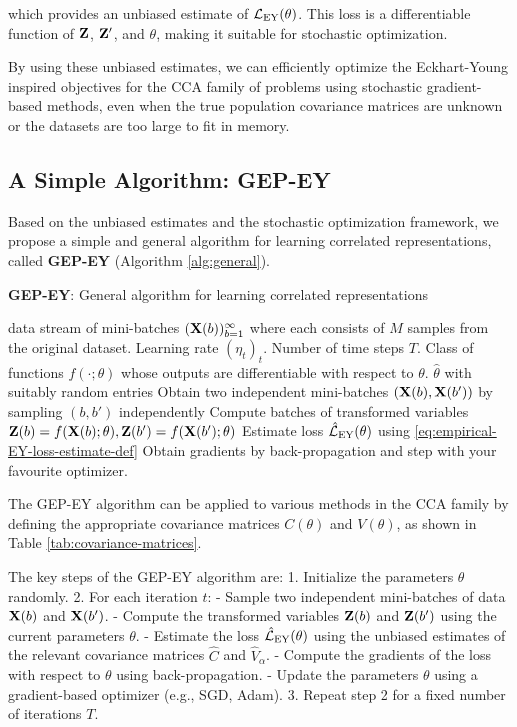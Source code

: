 which provides an unbiased estimate of $\mathcal{L}_\text{EY}(\theta)$. This loss is a differentiable function of $\mathbf{Z}$, $\mathbf{Z}'$, and $\theta$, making it suitable for stochastic optimization.

By using these unbiased estimates, we can efficiently optimize the Eckhart-Young inspired objectives for the CCA family of problems using stochastic gradient-based methods, even when the true population covariance matrices are unknown or the datasets are too large to fit in memory.

\subsection{A Simple Algorithm: GEP-EY}

Based on the unbiased estimates and the stochastic optimization framework, we propose a simple and general algorithm for learning correlated representations, called \textbf{GEP-EY} (Algorithm \ref{alg:general}).

\begin{algorithm}
\caption{\textbf{GEP-EY}: General algorithm for learning correlated representations}
\label{alg:general}
\begin{algorithmic}
 data stream of mini-batches $(\mathbf{X}(b))_{b=1}^\infty$ where each consists of $M$ samples from the original dataset. Learning rate $(\eta_t)_t$. Number of time steps $T$. Class of functions $f(\cdot; \theta)$ whose outputs are differentiable with respect to $\theta$.
 $\hat{\theta}$ with suitably random entries
\STATE Obtain two independent mini-batches $( \mathbf{X}(b), \mathbf{X}(b') )$ by sampling $( b, b' )$ independently
\STATE Compute batches of transformed variables $\mathbf{Z}(b) = f(\mathbf{X}(b); \theta), \mathbf{Z}(b') = f(\mathbf{X}(b'); \theta)$
\STATE Estimate loss $\hat{\mathcal{L}}_\text{EY}(\theta)$ using \cref{eq:empirical-EY-loss-estimate-def}
\STATE Obtain gradients by back-propagation and step with your favourite optimizer.
\ENDFOR
\end{algorithmic}
\end{algorithm}

The GEP-EY algorithm can be applied to various methods in the CCA family by defining the appropriate covariance matrices $C(\theta)$ and $V(\theta)$, as shown in Table \ref{tab:covariance-matrices}.

The key steps of the GEP-EY algorithm are:
1. Initialize the parameters $\theta$ randomly.
2. For each iteration $t$:
   - Sample two independent mini-batches of data $\mathbf{X}(b)$ and $\mathbf{X}(b')$.
   - Compute the transformed variables $\mathbf{Z}(b)$ and $\mathbf{Z}(b')$ using the current parameters $\theta$.
   - Estimate the loss $\hat{\mathcal{L}}_\text{EY}(\theta)$ using the unbiased estimates of the relevant covariance matrices $\hat{C}$ and $\hat{V}_\alpha$.
   - Compute the gradients of the loss with respect to $\theta$ using back-propagation.
   - Update the parameters $\theta$ using a gradient-based optimizer (e.g., SGD, Adam).
3. Repeat step 2 for a fixed number of iterations $T$.

